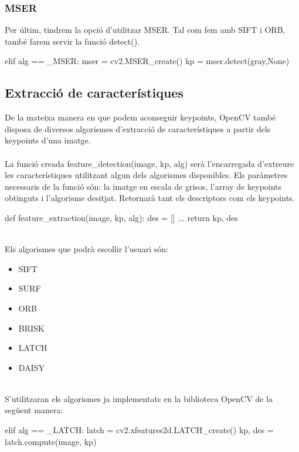 		\subsubsection{MSER}
		Per últim, tindrem la opció d'utilitzar MSER. Tal com fem amb SIFT i ORB, també farem servir la funció detect().\\
		\begin{python}
	elif alg == _MSER:
		mser = cv2.MSER_create()
		kp = mser.detect(gray,None)
		\end{python}
\newpage
	\subsection{Extracció de característiques}
		De la mateixa manera en que podem aconseguir keypoints, OpenCV també disposa de diversos algorismes d'extracció de característiques a partir dels keypoints d'una imatge.\\\\
		La funció creada feature{\_}detection(image, kp, alg) serà l'encarregada d'extreure les característiques utilitzant algun dels algorismes disponibles. Els paràmetres necessaris de la funció són:
		la imatge en escala de grisos, l'array de keypoints obtinguts i l'algorisme desitjat. Retornarà tant els descriptors com els keypoints.\\

		\begin{python}
def feature_extraction(image, kp, alg):
	des = []
	...
	return kp, des
		\end{python}
		\ \\Els algorismes que podrà escollir l'usuari són:
		\begin{multicols}{3} 
			\begin{itemize}
				\item{SIFT}
				\item{SURF}
				\item{ORB}
				\item{BRISK}
				\item{LATCH}
				\item{DAISY}
			\end{itemize}
		\end{multicols}
	\ \\S'utilitzaran els algorismes ja implementats en la biblioteca OpenCV de la següent manera:\\

		\begin{python}
	elif alg == _LATCH:
		latch = cv2.xfeatures2d.LATCH_create()
		kp, des = latch.compute(image, kp)
		\end{python}

